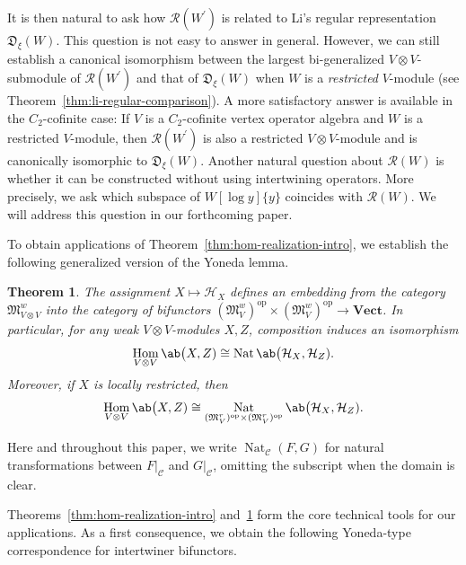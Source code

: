 \documentclass[12pt, english]{article}
\numberwithin{equation}{section}
\DeclareMathOperator{\Hom}{Hom}
\DeclareMathOperator{\opp}{op}
\DeclareMathOperator{\Nat}{Nat}
\theoremstyle{plain}
\newtheorem{mainthm}{Theorem}
\theoremstyle{definition}
\theoremstyle{remark}
\begin{document}
	It is then natural to ask how $\mathcal{R}(W^\prime)$ is related to Li's regular representation $\mathfrak{D}_{\xi}(W)$. This question is not easy to answer in general. However, we can still establish a canonical isomorphism between the largest bi-generalized $V\otimes V$-submodule of $\mathcal{R}(W^\prime)$ and that of $\mathfrak{D}_{\xi}(W)$ when $W$ is a \emph{restricted} $V$-module (see Theorem~\ref{thm:li-regular-comparison}). 
	A more satisfactory answer is available in the $C_2$-cofinite case: If $V$ is a $C_2$-cofinite vertex operator algebra and $W$ is a restricted $V$-module, then $\mathcal{R}(W^\prime)$ is also a restricted $V\otimes V$-module and is canonically isomorphic to $\mathfrak{D}_{\xi}(W)$.
	Another natural question about $\mathcal{R}(W)$ is whether it can be constructed without using intertwining operators. More precisely, we ask which subspace of $W[\log y] \{y\}$ coincides with $\mathcal{R}(W)$.
	We will address this question in our forthcoming paper.
	
	
	To obtain applications of Theorem~\ref{thm:hom-realization-intro}, we establish the following generalized version of the Yoneda lemma.
	
	\begin{mainthm}\label{thm:external-yoneda-intro}
		The assignment $X \mapsto \mathcal{H}_X$ defines an embedding from the category $\mathfrak{M}^w_{V \otimes V}$ into the category of bifunctors $(\mathfrak{M}^w_V)^{\opp}\times(\mathfrak{M}^w_V)^{\opp} \to \mathbf{Vect}$. 
		In particular, for any weak $V\otimes V$-modules $X, Z$, composition induces an isomorphism
		\begin{equation}\label{eq:external-yoneda-intro}
			\Hom_{V\otimes V} \ab\big(X, Z)
			\cong \Nat \ab\big(\mathcal{H}_X, \mathcal{H}_Z).
		\end{equation}
		Moreover, if $X$ is locally restricted, then
		\begin{equation}\label{eq:restricted-external-yoneda-intro}
			\Hom_{V\otimes V} \ab\big(X, Z)
			\cong \Nat_{(\mathfrak{M}^r_V)^{\opp}\times(\mathfrak{M}^r_V)^{\opp}} \ab\big(\mathcal{H}_X, \mathcal{H}_Z).
		\end{equation}
	\end{mainthm}
	
	
	Here and throughout this paper, we write $\Nat_{\mathcal{C}}(F,G)$ for natural transformations between $F|_{\mathcal{C}}$ and $G|_{\mathcal{C}}$, omitting the subscript when the domain is clear.
	
	Theorems~\ref{thm:hom-realization-intro} and~\ref{thm:external-yoneda-intro} form the core technical tools for our applications.
	As a first consequence, we obtain the following Yoneda-type correspondence for intertwiner bifunctors.
	
\end{document}
